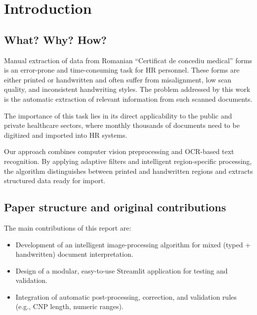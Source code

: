 \documentclass[runningheads,a4paper,11pt]{report}
\begin{document}
\tableofcontents
\newpage
\listoftables
\listoffigures
\listofalgorithms
\newpage
{}

\chapter{Introduction}
\label{chapter:introduction}

\section{What? Why? How?}
Manual extraction of data from Romanian ``Certificat de concediu medical'' forms is an error-prone and time-consuming task for HR personnel. These forms are either printed or handwritten and often suffer from misalignment, low scan quality, and inconsistent handwriting styles. The problem addressed by this work is the automatic extraction of relevant information from such scanned documents.

The importance of this task lies in its direct applicability to the public and private healthcare sectors, where monthly thousands of documents need to be digitized and imported into HR systems. 

Our approach combines computer vision preprocessing and OCR-based text recognition. By applying adaptive filters and intelligent region-specific processing, the algorithm distinguishes between printed and handwritten regions and extracts structured data ready for import.

\section{Paper structure and original contributions}
The main contributions of this report are:
\begin{itemize}
\item Development of an intelligent image-processing algorithm for mixed (typed + handwritten) document interpretation.
\item Design of a modular, easy-to-use Streamlit application for testing and validation.
\item Integration of automatic post-processing, correction, and validation rules (e.g., CNP length, numeric ranges).
\end{itemize}
\end{document}
